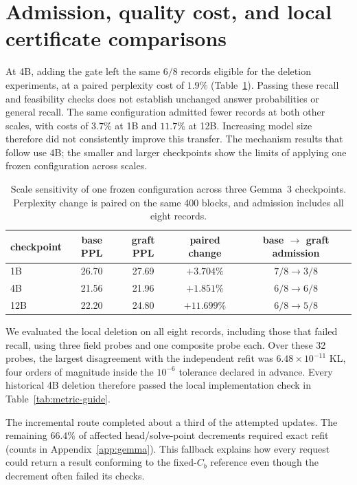 \section{Admission, quality cost, and local certificate comparisons}\label{sec:gemma}

At 4B, adding the gate left the same \(6/8\) records eligible for the
deletion experiments, at a paired perplexity cost of \(1.9\%\)
(Table~\ref{tab:scale}). Passing these recall and feasibility checks does
not establish unchanged answer probabilities or general recall. The same
configuration admitted fewer records at both other scales, with costs of
\(3.7\%\) at 1B and \(11.7\%\) at 12B. Increasing model size therefore
did not consistently improve this transfer. The mechanism results that
follow use 4B; the smaller and larger checkpoints show the limits of applying
one frozen configuration across scales.

\begin{table}[h]
\centering
\caption{Scale sensitivity of one frozen configuration across three Gemma~3
checkpoints. Perplexity change is paired on the same 400 blocks, and admission
includes all eight records.}
\label{tab:scale}
\small
\begin{tabular}{@{}lcccc@{}}
\toprule
checkpoint & base PPL & graft PPL & paired change & base \(\to\) graft admission \\
\midrule
1B & 26.70 & 27.69 & \(+3.704\%\) & \(7/8\to3/8\) \\
4B & 21.56 & 21.96 & \(+1.851\%\) & \(6/8\to6/8\) \\
12B & 22.20 & 24.80 & \(+11.699\%\) & \(6/8\to5/8\) \\
\bottomrule
\end{tabular}
\end{table}

We evaluated the local deletion on all eight records, including those that
failed recall, using three field probes and one composite probe each. Over
these 32 probes, the largest disagreement with the independent refit was
\(6.48\times10^{-11}\) KL, four orders of magnitude inside the
\(10^{-6}\) tolerance declared in advance. Every historical 4B deletion
therefore passed the local implementation check in
Table~\ref{tab:metric-guide}.

The incremental route completed about a third of the attempted updates.
The remaining \(66.4\%\) of affected head/solve-point decrements required
exact refit (counts in Appendix~\ref{app:gemma}). This fallback explains
how every request could return a result conforming to the fixed-\(C_b\)
reference even though the decrement often failed its checks.

